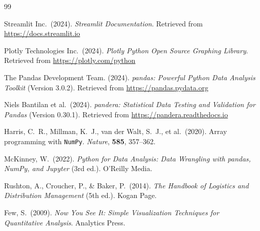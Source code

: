 \documentclass[12pt, a4paper]{report}
\begin{document}
\clearpage
{}
\begin{thebibliography}{99}
  \setlength{\itemsep}{6pt}

    Streamlit Inc.\ (2024).
    \textit{Streamlit Documentation}.
    Retrieved from \url{https://docs.streamlit.io}

    Plotly Technologies Inc.\ (2024).
    \textit{Plotly Python Open Source Graphing Library}.
    Retrieved from \url{https://plotly.com/python}

    The Pandas Development Team. (2024).
    \textit{pandas: Powerful Python Data Analysis Toolkit} (Version 3.0.2).
    Retrieved from \url{https://pandas.pydata.org}

    Niels Bantilan et al.\ (2024).
    \textit{pandera: Statistical Data Testing and Validation for Pandas}
    (Version 0.30.1).
    Retrieved from \url{https://pandera.readthedocs.io}

    Harris, C.\ R., Millman, K.\ J., van der Walt, S.\ J., et al.\ (2020).
    Array programming with \texttt{NumPy}.
    \textit{Nature}, \textbf{585}, 357--362.

    McKinney, W.\ (2022).
    \textit{Python for Data Analysis: Data Wrangling with pandas, NumPy, and Jupyter}
    (3rd ed.). O'Reilly Media.

    Rushton, A., Croucher, P., \& Baker, P.\ (2014).
    \textit{The Handbook of Logistics and Distribution Management}
    (5th ed.). Kogan Page.

    Few, S.\ (2009).
    \textit{Now You See It: Simple Visualization Techniques for Quantitative Analysis}.
    Analytics Press.

\end{thebibliography}
\end{document}
